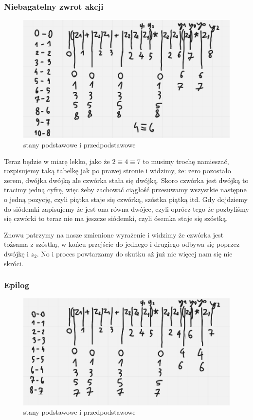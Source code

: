 \subsubsection{Niebagatelny zwrot akcji}

\begin{figure}[h!]
    \centering
    \includegraphics[width=.6\textwidth]{images/regex/reg_pp2.png}
    \caption{stany podstawowe i przedpodstawowe}
    \label{fig:my_label}
\end{figure}

Teraz będzie w miarę lekko, jako że $2\equiv4\equiv7$ to musimy trochę namieszać, rozpisujemy taką tabelkę jak po prawej stronie i widzimy, że: zero pozostało zerem, dwójka dwójką ale czwórka stała się dwójką. Skoro czwórka jest dwójką to tracimy jedną cyfrę, więc żeby zachować ciągłość przesuwamy wszystkie następne o jedną pozycję, czyli piątka staje się czwórką, szóstka piątką itd. Gdy dojdziemy do siódemki zapisujemy że jest ona równa dwójce, czyli oprócz tego że pozbyliśmy się czwórki to teraz nie ma jeszcze siódemki, czyli ósemka staje się szóstką.

Znowu patrzymy na nasze zmienione wyrażenie i widzimy że czwórka jest tożsama z szóstką, w końcu przejście do jednego i drugiego odbywa się poprzez dwójkę i $z_2$. No i proces powtarzamy do skutku aż już nic więcej nam się nie skróci.

\newpage

\subsubsection{Epilog}

\begin{figure}[h!]
    \centering
    \includegraphics[width=.6\textwidth]{images/regex/reg_pp3.png}
    \caption{stany podstawowe i przedpodstawowe}
    \label{fig:my_label}
\end{figure}


